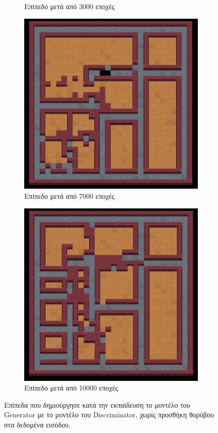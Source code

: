 \begin{figure}[H]
\begin{subfigure}{.5\textwidth}
  \caption{Επίπεδο μετά από 3000 εποχές}
  \label{fig:sfig2}
\end{subfigure}
\begin{subfigure}{.5\textwidth}
  \centering
  \includegraphics[width=.8\linewidth]{../images/result_images/cnn-gan/combined_7000.png}
  \caption{Επίπεδο μετά από 7000 εποχές}
  \label{fig:sfig2}
\end{subfigure}
\begin{subfigure}{.5\textwidth}
  \centering
  \includegraphics[width=.8\linewidth]{../images/result_images/cnn-gan/combined_10000.png}
  \caption{Επίπεδο μετά από 10000 εποχές}
  \label{fig:sfig2}
\end{subfigure}
\caption{Επίπεδα που δημιούργησε κατά την εκπαίδευση το μοντέλο του Generator με το μοντέλο του Discriminator, χωρίς προσθήκη θορύβου στα δεδομένα εισόδου.}
\label{fig:fig}
\end{figure}

